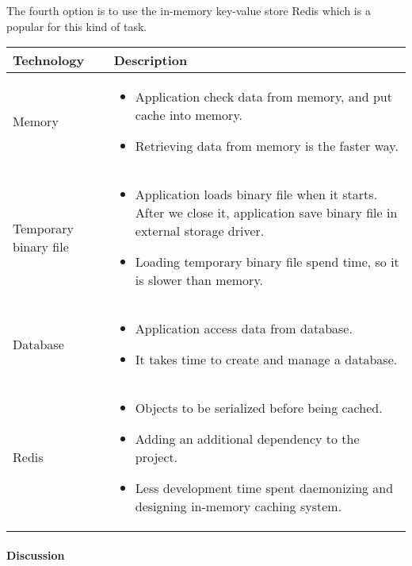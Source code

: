 The fourth option is to use the in-memory key-value store Redis \cite{redis} which is a popular for this kind of task.

\begin{center}
    \begin{tabular}{ | l | p{10cm} |}
    \hline
    Technology & Description  \\ \hline

    Memory &
    \begin{itemize}
      \item Application check data from memory, and put cache into memory.
      \item Retrieving data from memory is the faster way.
    \end{itemize} \\ \hline

    Temporary binary file &
    \begin{itemize}
      \item Application loads binary file when it starts. After we close it, application save binary file in external storage driver.
      \item Loading temporary binary file spend time, so it is slower than memory.
    \end{itemize} \\ \hline

    Database &
    \begin{itemize}
      \item Application access data from database.
      \item It takes time to create and manage a database.
    \end{itemize} \\ \hline

    Redis &
    \begin{itemize}
      \item Objects to be serialized before being cached.
      \item Adding an additional dependency to the project.
      \item Less development time spent daemonizing and designing in-memory caching system.
    \end{itemize} \\ \hline
    \end{tabular}
\end{center}

\paragraph{Discussion}

